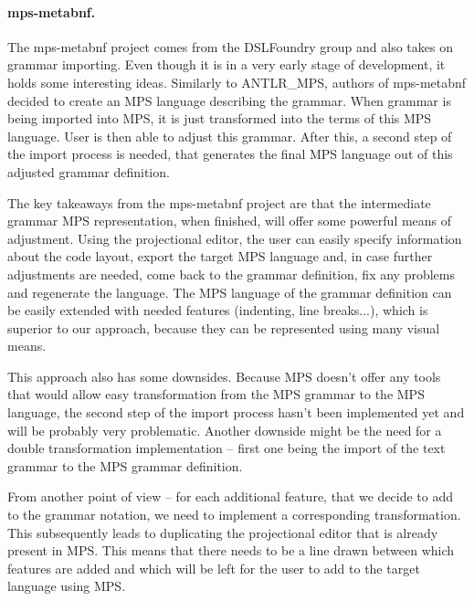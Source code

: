 \paragraph{mps-metabnf.}
The mps-metabnf project comes from the DSLFoundry group and also takes on grammar importing.
Even though it is in a very early stage of development, it holds some interesting ideas.
Similarly to ANTLR{\_}MPS, authors of mps-metabnf decided to create an MPS language describing the grammar.
When grammar is being imported into MPS, it is just transformed into the terms of this MPS language.
User is then able to adjust this grammar.
After this, a second step of the import process is needed, that generates the final MPS language out of this adjusted grammar definition.

The key takeaways from the mps-metabnf project are that the intermediate grammar MPS representation, when finished, will offer some powerful means of adjustment.
Using the projectional editor, the user can easily specify information about the code layout, export the target MPS language and, in case further adjustments are needed, come back to the grammar definition, fix any problems and regenerate the language.
The MPS language of the grammar definition can be easily extended with needed features (indenting, line breaks...), which is superior to our approach, because they can be represented using many visual means.

This approach also has some downsides.
Because MPS doesn't offer any tools that would allow easy transformation from the MPS grammar  to the MPS language, the second step of the import process hasn't been implemented yet and will be probably very problematic.
Another downside might be the need for a double transformation implementation -- first one being the import of the text grammar to the MPS grammar definition.

From another point of view -- for each additional feature, that we decide to add to the grammar notation, we need to implement a corresponding transformation.
This subsequently leads to duplicating the projectional editor that is already present in MPS.
This means that there needs to be a line drawn between which features are added and which will be left for the user to add to the target language using MPS.


